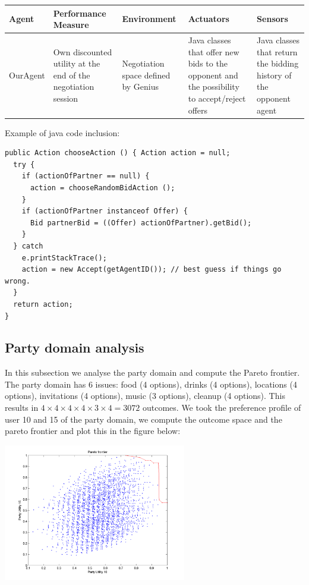 \documentclass[a4paper,10pt]{article}
\begin{document}
\begin{table}[H]
    \begin{tabular}{|p{1.8cm}|p{3cm}|p{3cm}|p{3cm}|p{3cm}|}
    \hline
    \textbf{Agent} & \textbf{Performance \mbox{Measure}} & \textbf{Environment} & \textbf{Actuators} & \textbf{Sensors} \\
    \hline
    OurAgent & Own discounted utility at the end of the negotiation session & Negotiation space defined by Genius & Java classes that offer new bids to the opponent and the possibility to \mbox{accept/reject} offers & Java classes that return the bidding history of the \mbox{opponent} agent \\
    \hline
    \end{tabular}
\end{table}

Example of java code inclusion:
\begin{lstlisting}
public Action chooseAction () { Action action = null;
  try {
    if (actionOfPartner == null) {
      action = chooseRandomBidAction ();
    }
    if (actionOfPartner instanceof Offer) {
      Bid partnerBid = ((Offer) actionOfPartner).getBid();
    }
  } catch
    e.printStackTrace();
    action = new Accept(getAgentID()); // best guess if things go wrong.
  }
  return action; 
}
\end{lstlisting}

\subsection{Party domain analysis}

In this subsection we analyse the party domain and compute the Pareto frontier.
The party domain has 6 issues: food (4 options), drinks (4 options), 
locations (4 options), invitations (4 options), music (3 options), cleanup (4 options).
This results in $4 \times 4 \times 4 \times 4 \times 3 \times 4 = 3072$ outcomes.
We took the preference profile of user 10 and 15 of the party domain,
we compute the outcome space and the pareto frontier and plot this in the figure below:

\begin{center}
 \includegraphics[width=0.6\textwidth]{pareto.png}
\end{center}
\end{document}
